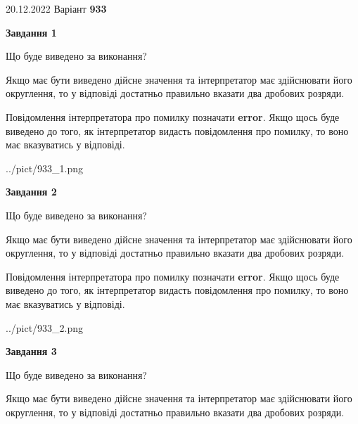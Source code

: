 \documentclass[12pt, ukrainian]{article}
\begin{document}
{20.12.2022 Варіант \No \textbf { 933 }\par}
{
\begin {Large}

{\begin {center}\textbf{Завдання 1}\end {center}}\par
Що буде виведено за виконання? \par

Якщо має бути виведено дійсне значення та інтерпретатор має здійснювати його округлення, 
то у відповіді достатньо правильно вказати два дробових розряди.

Повідомлення інтерпретатора про помилку позначати \textbf{error}.
Якщо щось буде виведено до того, як інтерпретатор видасть повідомлення про помилку, 
то воно має вказуватись у відповіді. \par

\begin{center}
	{../pict/933_1.png}
\end{center}
\newpage

{\begin {center}\textbf{Завдання 2}\end {center}}\par
Що буде виведено за виконання? \par

Якщо має бути виведено дійсне значення та інтерпретатор має здійснювати його округлення, 
то у відповіді достатньо правильно вказати два дробових розряди.

Повідомлення інтерпретатора про помилку позначати \textbf{error}.
Якщо щось буде виведено до того, як інтерпретатор видасть повідомлення про помилку, 
то воно має вказуватись у відповіді. \par

\begin{center}
	{../pict/933_2.png}
\end{center}
\newpage

{\begin {center}\textbf{Завдання 3}\end {center}}\par
Що буде виведено за виконання? \par

Якщо має бути виведено дійсне значення та інтерпретатор має здійснювати його округлення, 
то у відповіді достатньо правильно вказати два дробових розряди.


\end{Large}}
\end{document}
